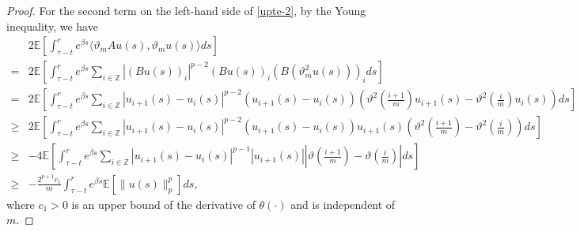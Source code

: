 \documentclass[11pt]{article}
\numberwithin{equation}{section}
\theoremstyle{plain}
\begin{document}
\begin{proof}
 For the second term on the left-hand side of \eqref{upte-2},
 by the Young inequality, we have
 \begin{align}\label{upte-3}
        & 2 \mathbb{E}
               \left[ \int_{\tau-t}^{r}  e^{\beta s}
                            \langle \vartheta_m A u(s), \vartheta_m u(s) \rangle ds
               \right]  \nonumber\\
      = & 2 \mathbb{E}
               \left[ \int_{\tau-t}^{r}  e^{\beta s}
                  \sum_{i \in \mathbb{Z}} |(Bu(s))_i|^{p-2} (Bu(s))_i
                        (B (\vartheta_m^2 u(s) ) )_i ds
               \right]  \nonumber\\
      = & 2 \mathbb{E}
               \left[ \int_{\tau-t}^{r}  e^{\beta s}
                  \sum_{i \in \mathbb{Z}}
                        |u_{i+1}(s)- u_i(s)|^{p-2}
                        (u_{i+1}(s)- u_i(s) )
                        ({\vartheta}^2(\frac{i+1}{m}) u_{i+1}(s) -{\vartheta}^2(\frac{i}{m}) u_{i}(s) ) ds
               \right]  \nonumber\\
   \ge & 2 \mathbb{E}
               \left[ \int_{\tau-t}^{r}  e^{\beta s}
                  \sum_{i \in \mathbb{Z}}
                        |u_{i+1}(s)- u_i(s)|^{p-2}
                        (u_{i+1}(s)- u_i(s) ) u_{i+1}(s)
                        ({\vartheta}^2(\frac{i+1}{m}) -{\vartheta}^2(\frac{i}{m}) ) ds
               \right]  \nonumber\\
   \ge & - 4 \mathbb{E}
               \left[ \int_{\tau-t}^{r}  e^{\beta s}
                  \sum_{i \in \mathbb{Z}}
                        |u_{i+1}(s)- u_i(s)|^{p-1}
                        |u_{i+1}(s)|
                        | \vartheta(\frac{i+1}{m}) - \vartheta(\frac{i}{m}) | ds
               \right]  \nonumber\\
   \ge & -\frac{2^{p+1} c_1}{m}
              \int_{\tau-t}^{r} e^{\beta s} \mathbb{E} \left[ \|u(s)\|_p^p \right] ds,
 \end{align}
 where $c_1>0$ is
 an upper  bound of the derivative of $\theta(\cdot)$ and is independent of $m$.


\end{proof}
\end{document}
